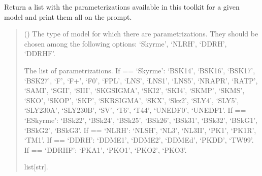 \documentclass[letterpaper,10pt,english]{sphinxmanual}
\begin{document}

\begin{fulllineitems}
\label{\detokenize{source/api/setup_matter_pheno:nucleardatapy.matter.setup_pheno.pheno_params}}
\pysigstartsignatures
{}
\pysigstopsignatures
\sphinxAtStartPar
Return a list with the parameterizations available in
this toolkit for a given model and print them all on the prompt.
\begin{quote}\begin{description}
\sphinxAtStartPar
{} () \textendash{} The type of model for which there are parametrizations. They should be chosen among the following options: ‘Skyrme’, ‘NLRH’, ‘DDRH’, ‘DDRHF’.

\sphinxAtStartPar
The list of parametrizations.     If  == ‘Skyrme’: ‘BSK14’,     ‘BSK16’, ‘BSK17’, ‘BSK27’, ‘F\sphinxhyphen{}’, ‘F+’, ‘F0’, ‘FPL’, ‘LNS’, ‘LNS1’, ‘LNS5’,     ‘NRAPR’, ‘RATP’, ‘SAMI’, ‘SGII’, ‘SIII’, ‘SKGSIGMA’, ‘SKI2’, ‘SKI4’, ‘SKMP’,     ‘SKMS’, ‘SKO’, ‘SKOP’, ‘SKP’, ‘SKRSIGMA’, ‘SKX’, ‘Skz2’, ‘SLY4’, ‘SLY5’,     ‘SLY230A’, ‘SLY230B’, ‘SV’, ‘T6’, ‘T44’, ‘UNEDF0’, ‘UNEDF1’.     If  == ‘ESkyrme’: ‘BSk22’, ‘BSk24’, ‘BSk25’, ‘BSk26’, ‘BSk31’, ‘BSk32’,     ‘BSkG1’, ‘BSkG2’, ‘BSkG3’.     If  == ‘NLRH’: ‘NL\sphinxhyphen{}SH’, ‘NL3’, ‘NL3II’, ‘PK1’, ‘PK1R’, ‘TM1’.     If  == ‘DDRH’: ‘DDME1’, ‘DDME2’, ‘DDMEd’, ‘PKDD’, ‘TW99’.     If  == ‘DDRHF’: ‘PKA1’, ‘PKO1’, ‘PKO2’, ‘PKO3’.

\sphinxAtStartPar
list{[}str{]}.

\end{description}\end{quote}

\end{fulllineitems}

\end{document}
